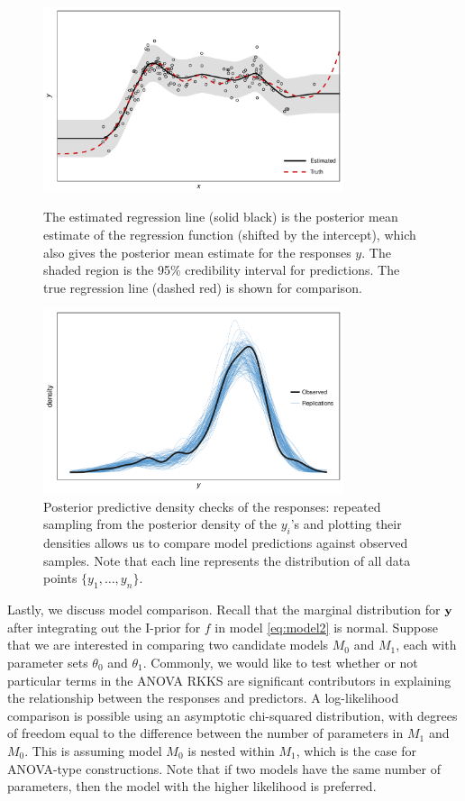 \begin{figure}[p]
  \centering
  \includegraphics[width=0.785\textwidth]{figure/04-post_reg_cred}
  \caption[Posterior regression and credibility intervals]{The estimated regression line (solid black) is the posterior mean estimate of the regression function (shifted by the intercept), which also gives the posterior mean estimate for the responses $y$. The shaded region is the 95\% credibility interval for predictions. The true regression line (dashed red) is shown for comparison.}
  \vspace{2em}
  \includegraphics[width=0.785\textwidth]{figure/04-post_reg_ppc}
  \caption[Posterior predictive density check]{Posterior predictive density checks of the responses: repeated sampling from the posterior density of the $y_i$'s and plotting their densities allows us to compare model predictions against observed samples. Note that each line represents the distribution of all data points $\{y_1,\dots,y_n\}$.}
  \label{fig:postregppc}
\end{figure}

Lastly, we discuss model comparison.
Recall that the marginal distribution for ${\mathbf y}$ after integrating out the I-prior for $f$ in model \cref{eq:model2} is normal.
Suppose that we are interested in comparing two candidate models $M_0$ and $M_1$, each with parameter sets $\theta_0$ and $\theta_1$.
Commonly, we would like to test whether or not particular terms in the ANOVA RKKS are significant contributors in explaining the relationship between the responses and predictors.
A log-likelihood comparison is possible using an asymptotic chi-squared distribution, with degrees of freedom equal to the difference between the number of parameters in $M_1$ and $M_0$.
This is assuming model $M_0$ is nested within $M_1$, which is the case for ANOVA-type constructions.
Note that if two models have the same number of parameters, then the model with the higher likelihood is preferred.

